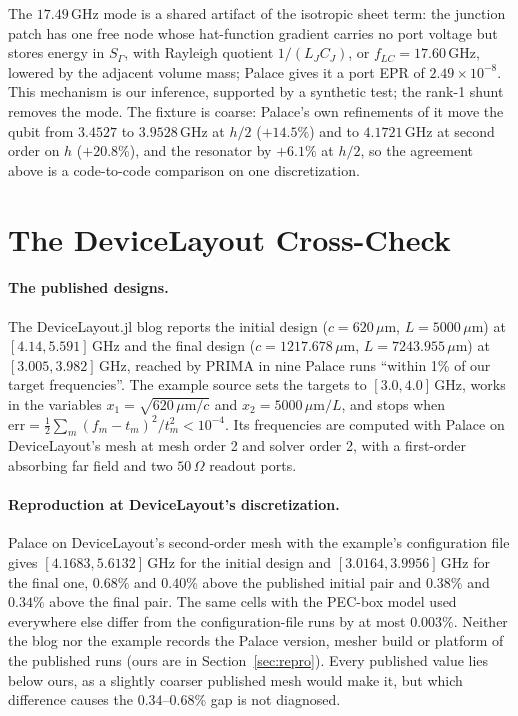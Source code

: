 \documentclass{anvil-paper}
\begin{document}
The $17.49$\,GHz mode is a shared artifact of the isotropic sheet term:
the junction patch has one free node whose hat-function gradient carries no
port voltage but stores energy in $S_\Gamma$, with Rayleigh quotient
$1/(L_JC_J)$, or $f_{LC} = 17.60$\,GHz, lowered by the adjacent volume
mass; Palace gives it a port EPR of $2.49\times10^{-8}$. This mechanism is
our inference, supported by a synthetic test; the rank-1 shunt removes the
mode. The fixture is coarse: Palace's own refinements of it move the qubit from
$3.4527$ to $3.9528$\,GHz at $h/2$ ($+14.5\%$) and to $4.1721$\,GHz at
second order on $h$ ($+20.8\%$), and the resonator by $+6.1\%$ at $h/2$, so
the agreement above is a code-to-code comparison on one discretization.

\section{The DeviceLayout Cross-Check}
\label{sec:crosscheck}

\paragraph{The published designs.}
The DeviceLayout.jl blog \citep{devicelayout-blog} reports the initial
design ($c = 620\,\mu$m, $L = 5000\,\mu$m) at $[4.14, 5.591]$\,GHz and
the final design ($c = 1217.678\,\mu$m, $L = 7243.955\,\mu$m) at
$[3.005, 3.982]$\,GHz, reached by PRIMA in nine Palace runs ``within 1\% of
our target frequencies''. The example source \citep{devicelayout-example}
sets the targets to $[3.0, 4.0]$\,GHz, works in the variables $x_1 =
\sqrt{620\,\mu\mathrm{m}/c}$ and $x_2 = 5000\,\mu\mathrm{m}/L$, and stops
when $\mathrm{err} = \frac12\sum_m (f_m - t_m)^2/t_m^2 < 10^{-4}$. Its
frequencies are computed with Palace on DeviceLayout's mesh at mesh order 2
and solver order 2, with a first-order absorbing far field and two
$50\,\Omega$ readout ports.

\paragraph{Reproduction at DeviceLayout's discretization.}
Palace on DeviceLayout's second-order mesh with the example's
configuration file gives $[4.1683, 5.6132]$\,GHz for the initial design
and $[3.0164, 3.9956]$\,GHz for the final one, $0.68\%$ and $0.40\%$
above the published initial pair and $0.38\%$ and $0.34\%$ above the
final pair. The same cells with the PEC-box model used everywhere else
differ from the configuration-file runs by at most $0.003\%$. Neither the
blog nor the example records the Palace version, mesher build or platform
of the published runs (ours are in Section~\ref{sec:repro}). Every published value lies
below ours, as a slightly coarser published mesh would make it, but which
difference causes the $0.34$--$0.68\%$ gap is not diagnosed.
\end{document}
